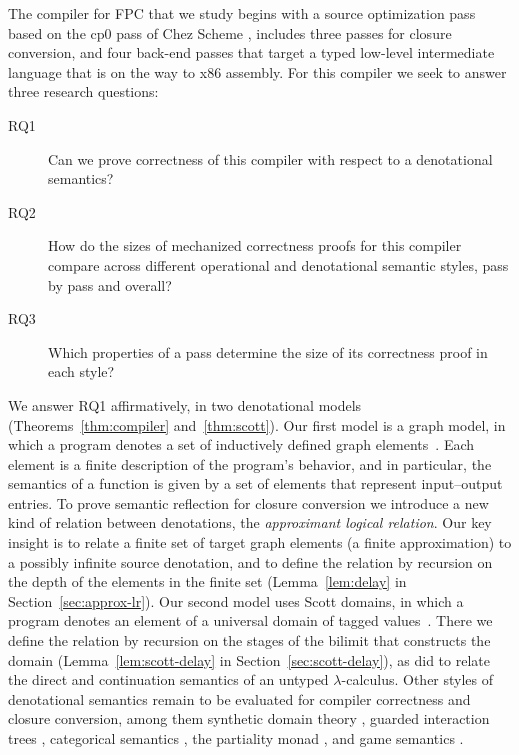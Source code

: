 The compiler for FPC that we study begins with a source optimization
pass based on the cp0 pass of Chez Scheme
\citep{Waddell:1997fk,Dybvig:2006aa}, includes three passes for
closure conversion, and four back-end passes that target a typed
low-level intermediate language that is on the way to x86
assembly. For this compiler we seek to answer three research
questions:
\begin{description}
\item[RQ1] Can we prove correctness of this compiler with respect to a
  denotational semantics?
\item[RQ2] How do the sizes of mechanized correctness proofs for this
  compiler compare across different operational and denotational
  semantic styles, pass by pass and overall?
\item[RQ3] Which properties of a pass determine the size of
  its correctness proof in each style?
\end{description}

We answer RQ1 affirmatively, in two denotational models
(Theorems~\ref{thm:compiler} and~\ref{thm:scott}). Our first model is
a graph model, in which a program denotes a set of inductively defined
graph
elements~\citep{Scott:1976lq,Engeler:1981aa,Plotkin:1993ab}. Each
element is a finite description of the program's behavior, and in
particular, the semantics of a function is given by a set of elements
that represent input--output entries.  To prove semantic reflection
for closure conversion we introduce a new kind of relation between
denotations, the \emph{approximant logical relation}. Our key insight
is to relate a finite set of target graph elements (a finite
approximation) to a possibly infinite source denotation, and to define
the relation by recursion on the depth of the elements in the finite
set (Lemma~\ref{lem:delay} in Section~\ref{sec:approx-lr}).  Our
second model uses Scott domains, in which a program denotes an element
of a universal domain of tagged values~\citep{Scott:1982aa}.  There we
define the relation by recursion on the stages of the bilimit that
constructs the domain (Lemma~\ref{lem:scott-delay} in
Section~\ref{sec:scott-delay}), as \citet{Reynolds:1974aa} did to
relate the direct and continuation semantics of an untyped
$\lambda$-calculus. Other styles of denotational semantics remain to
be evaluated for compiler correctness and closure conversion, among
them synthetic domain theory
\citep{Rosolini:1986aa,Hyland:1991aa,Birkedal:2011aa,Mogelberg:2016aa},
guarded interaction trees \citep{Frumin:2024aa}, categorical semantics
\citep{Fiore:1994aa}, the partiality monad \citep{Danielsson:2012aa},
and game semantics \citep{Hyland:2000ve}.

